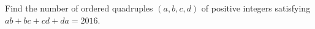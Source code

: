 Find the number of ordered quadruples $(a,b,c,d)$ of positive integers satisfying $ab+bc+cd+da=2016$.

